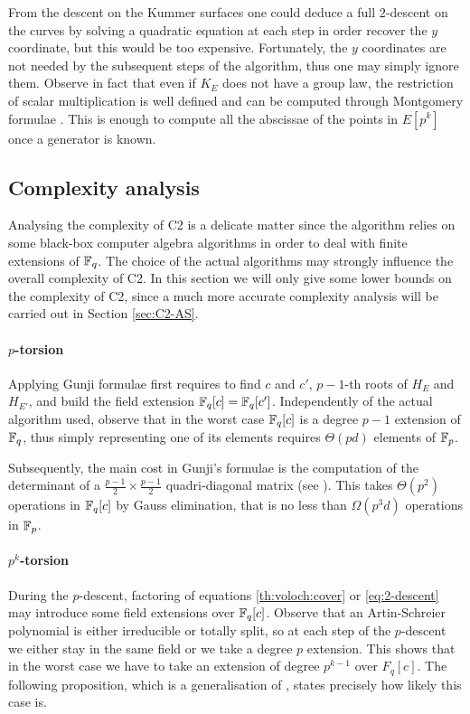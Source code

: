 From the descent on the Kummer surfaces one could deduce a full
$2$-descent on the curves by solving a quadratic equation at each step
in order recover the $y$ coordinate, but this would be too
expensive. Fortunately, the $y$ coordinates are not needed by the
subsequent steps of the algorithm, thus one may simply ignore
them. Observe in fact that even if $K_E$ does not have a group law,
the restriction of scalar multiplication is well defined and can be
computed through Montgomery formulae \cite{Mon87}. This is enough to
compute all the abscissae of the points in $E[p^k]$ once a generator
is known.


\subsection{Complexity analysis}
\label{sec:C2:complexity}
Analysing the complexity of C2 is a delicate matter since the
algorithm relies on some black-box computer algebra algorithms in
order to deal with finite extensions of $\mathbb{F}_q$. The choice of the
actual algorithms may strongly influence the overall complexity of C2.
In this section we will only give some lower bounds on the complexity
of C2, since a much more accurate complexity analysis will be carried
out in Section \ref{sec:C2-AS}.

\paragraph{$p$-torsion}
Applying Gunji formulae first requires to find $c$ and $c'$, $p-1$-th
roots of $H_E$ and $H_{E'}$, and build the field extension $\mathbb{F}_q[c] =
\mathbb{F}_q[c']$. Independently of the actual algorithm used, observe that in
the worst case $\mathbb{F}_q[c]$ is a degree $p-1$ extension of $\mathbb{F}_q$, thus
simply representing one of its elements requires $\Theta(pd)$ elements
of $\mathbb{F}_p$.

Subsequently, the main cost in Gunji's formulae is the computation of
the determinant of a $\frac{p-1}{2}\times\frac{p-1}{2}$
quadri-diagonal matrix (see \cite{Gun76}). This takes $\Theta(p^2)$
operations in $\mathbb{F}_q[c]$ by Gauss elimination, that is no less than
$\Omega(p^3d)$ operations in $\mathbb{F}_p$.

\paragraph{$p^k$-torsion}
During the $p$-descent, factoring of equations \eqref{th:voloch:cover}
or \eqref{eq:2-descent} may introduce some field extensions over
$\mathbb{F}_q[c]$. Observe that an Artin-Schreier polynomial is either
irreducible or totally split, so at each step of the $p$-descent we
either stay in the same field or we take a degree $p$ extension. This
shows that in the worst case we have to take an extension of degree
$p^{k-1}$ over $F_q[c]$. The following proposition, which is a
generalisation of \cite[Prop. 26]{Ler97}, states precisely how likely
this case is.


